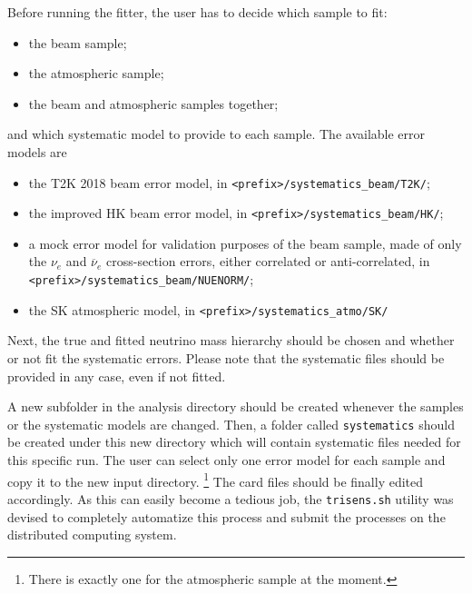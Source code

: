 \documentclass[a4paper, 11pt]{article}
\newcommand{\cj}{\overline}
\begin{document}
Before running the fitter, the user has to decide which sample to fit:
\begin{itemize}
	\item the beam sample;
	\item the atmospheric sample;
	\item the beam and atmospheric samples together;
\end{itemize}
and which systematic model to provide to each sample.
The available error models are
\begin{itemize}
	\small
	\item the T2K 2018 beam error model, in \texttt{<prefix>/systematics\_beam/T2K/};
	\item the improved HK beam error model, in \texttt{<prefix>/systematics\_beam/HK/};
	\item a mock error model for validation purposes of the beam sample, %
		made of only the $\nu_e$ and $\cj{\nu}_e$ %
		cross-section errors, either correlated or anti-correlated, %
		in \texttt{<prefix>/systematics\_beam/NUENORM/};
	\item the SK atmospheric model, in \texttt{<prefix>/systematics\_atmo/SK/}
\end{itemize}
Next, the true and fitted neutrino mass hierarchy should be chosen and whether or not %
fit the systematic errors.
Please note that the systematic files should be provided in any case, even if not fitted.

A new subfolder in the analysis directory should be created whenever the samples or %
the systematic models are changed.
Then, a folder called \texttt{systematics} should be created under this new directory %
which will contain systematic files needed for this specific run.
The user can select only one error model for each sample and copy it to the new input directory.%
\footnote{There is exactly one for the atmospheric sample at the moment.}
The card files should be finally edited accordingly.
As this can easily become a tedious job, the \texttt{trisens.sh} utility was devised to %
completely automatize this process and submit the processes on the distributed computing system.
\end{document}
